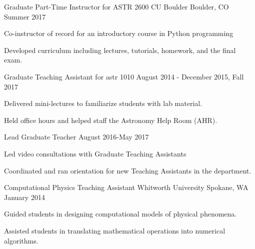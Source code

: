 

\begin{cventries}

  \cventry
  	{Graduate Part-Time Instructor for ASTR 2600}
	{CU Boulder}
	{Boulder, CO}
	{Summer 2017}
	{
		\begin{cvitems}
			\item Co-instructor of record for an introductory course in Python programming
			\item Developed curriculum including lectures, tutorials, homework, and the final exam.
		\end{cvitems}
	}


  \cventry
    {Graduate Teaching Assistant for astr 1010} %
    {} %
    {} %
    {August 2014 - December 2015, Fall 2017} %
    {
      \begin{cvitems} %
        \item {Delivered mini-lectures to familiarize students with lab material.}
        \item {Held office hours and helped staff the Astronomy Help Room (AHR).}
      \end{cvitems}
    }

  \cventry
    {Lead Graduate Teacher} %
    {} %
    {} %
    {August 2016-May 2017} %
    {
      \begin{cvitems} %
        \item {Led video consultations with Graduate Teaching Assistants}
        \item {Coordinated and ran orientation for new Teaching Assistants in the department.}
      \end{cvitems}
    }



  \cventry
    {Computational Physics Teaching Assistant} %
    {Whitworth University}
    {Spokane, WA} %
    {January 2014} %
    {
      \begin{cvitems} %
        \item {Guided students in designing computational models of physical phenomena.}
        \item {Assisted students in translating mathematical operations into numerical algorithms.}
      \end{cvitems}
    }


\end{cventries}
